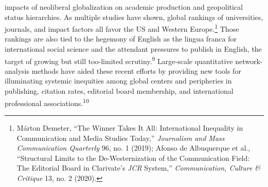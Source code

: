 \documentclass{tufte-handout}
\begin{document}
impacts of neoliberal globalization on academic production and
geopolitical status hierarchies. As multiple studies have shown, global
rankings of universities, journals, and impact factors all favor the US
and Western Europe.\footnote{Márton Demeter, ``The Winner Takes It All:
  International Inequality in Communication and Media Studies Today,''
  \emph{Journalism and Mass Communication Quarterly} 96, no. 1 (2019);
  Afonso de Albuquerque et al., ``Structural Limits to the
  De-Westernization of the Communication Field: The Editorial Board in
  Clarivate's \emph{JCR} System,'' \emph{Communication, Culture \&
  Critique} 13, no. 2 (2020).} Those rankings are also tied to the
hegemony of English as the lingua franca for international social
science and the attendant pressures to publish in English, the target of
growing but still too-limited scrutiny.\textsuperscript{9} Large-scale quantitative network-analysis
methods have aided these recent efforts by providing new tools for
illuminating systemic inequities among global centers and peripheries in
publishing, citation rates, editorial board membership, and
international professional associations.\textsuperscript{10}
\end{document}
